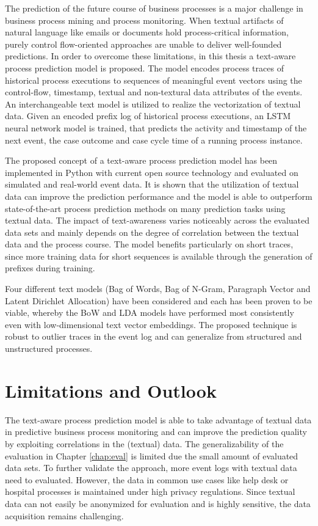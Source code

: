 The prediction of the future course of business processes is a major challenge in business process mining and process monitoring.
When textual artifacts of natural language like emails or documents hold process-critical information, purely control flow-oriented approaches are unable to deliver well-founded predictions.
In order to overcome these limitations, in this thesis a text-aware process prediction model is proposed.
The model encodes process traces of historical process executions to sequences of meaningful event vectors using the control-flow, timestamp, textual and non-textural data attributes of the events.
An interchangeable text model is utilized to realize the vectorization of textual data.
Given an encoded prefix log of historical process executions, an LSTM neural network model is trained, that predicts the activity and timestamp of the next event, the case outcome and case cycle time of a running process instance.

The proposed concept of a text-aware process prediction model has been implemented in Python with current open source technology and evaluated on simulated and real-world event data.
It is shown that the utilization of textual data can improve the prediction performance and the model is able to outperform state-of-the-art process prediction methods on many prediction tasks using textual data.
The impact of text-awareness varies noticeably across the evaluated data sets and mainly depends on the degree of correlation between the textual data and the process course.
The model benefits particularly on short traces, since more training data for short sequences is available through the generation of prefixes during training.

Four different text models (Bag of Words, Bag of N-Gram, Paragraph Vector and Latent Dirichlet Allocation) have been considered and each has been proven to be viable, whereby the BoW and LDA models have performed most consistently even with low-dimensional text vector embeddings.
The proposed technique is robust to outlier traces in the event log and can generalize from structured and unstructured processes.

\section{Limitations and Outlook}

The text-aware process prediction model is able to take advantage of textual data in predictive business process monitoring and can improve the prediction quality by exploiting correlations in the (textual) data.
The generalizability of the evaluation in Chapter \ref{chap:eval} is limited due the small amount of evaluated data sets.
To further validate the approach, more event logs with textual data need to evaluated.
However, the data in common use cases like help desk or hospital processes is maintained under high privacy regulations.
Since textual data can not easily be anonymized for evaluation and is highly sensitive, the data acquisition remains challenging.

